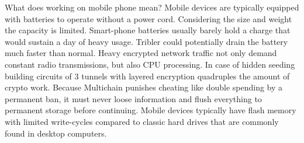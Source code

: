 What does working on mobile phone mean?
Mobile devices are typically equipped with batteries to operate without a power cord.
Considering the size and weight the capacity is limited.
Smart-phone batteries usually barely hold a charge that would sustain a day of heavy usage.
Tribler could potentially drain the battery much faster than normal.
Heavy encrypted network traffic not only demand constant radio transmissions, but also CPU processing.
In case of hidden seeding building circuits of 3 tunnels with layered encryption quadruples  the amount of crypto work.
Because Multichain punishes cheating like double spending by a permanent ban, it must never loose information and flush everything to permanent storage before continuing.
Mobile devices typically have flash memory with limited write-cycles compared to classic hard drives that are commonly found in desktop computers.

